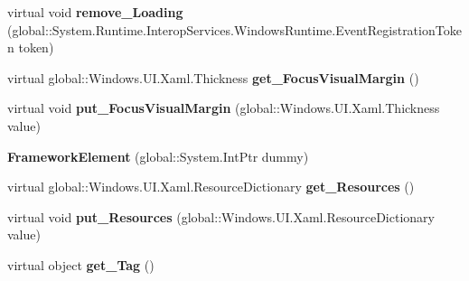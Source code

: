 \begin{DoxyCompactItemize}
\mbox{\label{class_windows_1_1_u_i_1_1_xaml_1_1_framework_element_a6ba35fb963a416a7b03b6ee63a82c138}} 
virtual void {\bfseries remove\+\_\+\+Loading} (global\+::\+System.\+Runtime.\+Interop\+Services.\+Windows\+Runtime.\+Event\+Registration\+Token token)
\item 
\mbox{\label{class_windows_1_1_u_i_1_1_xaml_1_1_framework_element_a1a058a053cdfa2551f3841b97735511c}} 
virtual global\+::\+Windows.\+U\+I.\+Xaml.\+Thickness {\bfseries get\+\_\+\+Focus\+Visual\+Margin} ()
\item 
\mbox{\label{class_windows_1_1_u_i_1_1_xaml_1_1_framework_element_abf95cce4264f515ac3309b6484f5835c}} 
virtual void {\bfseries put\+\_\+\+Focus\+Visual\+Margin} (global\+::\+Windows.\+U\+I.\+Xaml.\+Thickness value)
\item 
\mbox{\label{class_windows_1_1_u_i_1_1_xaml_1_1_framework_element_a1af8b4a08c326371edc3d91d80b4db81}} 
{\bfseries Framework\+Element} (global\+::\+System.\+Int\+Ptr dummy)
\item 
\mbox{\label{class_windows_1_1_u_i_1_1_xaml_1_1_framework_element_a933790d636d5d0e5dffc0eeccfea0e49}} 
virtual global\+::\+Windows.\+U\+I.\+Xaml.\+Resource\+Dictionary {\bfseries get\+\_\+\+Resources} ()
\item 
\mbox{\label{class_windows_1_1_u_i_1_1_xaml_1_1_framework_element_a203f639c05e0324e1d6c6eac84b913bb}} 
virtual void {\bfseries put\+\_\+\+Resources} (global\+::\+Windows.\+U\+I.\+Xaml.\+Resource\+Dictionary value)
\item 
\mbox{\label{class_windows_1_1_u_i_1_1_xaml_1_1_framework_element_ab65e3451cf2788c7a6f3e371c6713c95}} 
virtual object {\bfseries get\+\_\+\+Tag} ()
\item 
\mbox{\label{class_windows_1_1_u_i_1_1_xaml_1_1_framework_element_ac5e489cfe8d78a833e14d85301344eff}} 

\end{DoxyCompactItemize}
